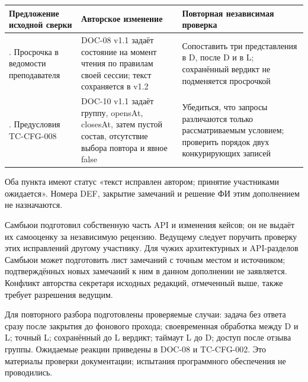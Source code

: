 \documentclass[12pt,a4paper]{article}
\newcounter{none} %
\begin{document}
{\def\LTcaptype{none} %
\begin{longtable}[]{@{}
  >{\raggedright\arraybackslash}p{}
  >{\raggedright\arraybackslash}p{}
  >{\raggedright\arraybackslash}p{}@{}}
\toprule\noalign{}
\begin{minipage}[b]{\linewidth}\raggedright
Предложение исходной сверки
\end{minipage} & \begin{minipage}[b]{\linewidth}\raggedright
Авторское изменение
\end{minipage} & \begin{minipage}[b]{\linewidth}\raggedright
Повторная независимая проверка
\end{minipage} \\
\midrule\noalign{}
\endhead
\bottomrule\noalign{}
\endlastfoot
1. Просрочка в ведомости преподавателя & DOC-08 v1.1 задаёт состояние на момент чтения по правилам своей сессии; текст сохраняется в v1.2 & Сопоставить три представления в D, после D и в L; сохранённый вердикт не подменяется просрочкой \\
2. Предусловия TC-CFG-008 & DOC-10 v1.1 задаёт группу, opensAt, closesAt, затем пустой состав, отсутствие выбора повтора и явное false & Убедиться, что запросы различаются только рассматриваемым условием; проверить порядок двух конкурирующих записей \\
\end{longtable}
}

Оба пункта имеют статус «текст исправлен автором; принятие участниками ожидается». Номера DEF, закрытие замечаний и решение ФИ этим дополнением не назначаются.

Самбьюи подготовил собственную часть API и изменения кейсов; он не выдаёт их самооценку за независимую рецензию. Ведущему следует поручить проверку этих исправлений другому участнику. Для чужих архитектурных и API-разделов Самбьюи может подготовить лист замечаний с точным местом и источником; подтверждённых новых замечаний к ним в данном дополнении не заявляется. Конфликт авторства секретаря исходных редакций, отмеченный выше, также требует разрешения ведущим.

Для повторного разбора подготовлены проверяемые случаи: задача без ответа сразу после закрытия до фонового прохода; своевременная обработка между D и L; точный L; сохранённый до L вердикт; таймаут L до D; доступ после отзыва группы. Ожидаемые реакции приведены в DOC-08 и TC-CFG-002. Это материалы проверки документации; испытания программного обеспечения не проводились.
\end{document}
